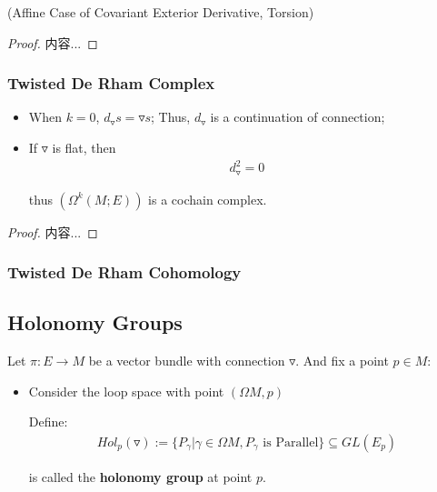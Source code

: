 \documentclass[Total.tex]{subfiles}
\begin{document}
			\begin{proposition}
				(Affine Case of Covariant Exterior Derivative, Torsion)
			\end{proposition}
			\begin{proof}
				内容...
			\end{proof}
			\subsubsection{Twisted De Rham Complex}
			\begin{proposition}
				\begin{itemize}
					\item When $k=0$, $d_\triangledown s=\triangledown s$; Thus, $d_\triangledown$ is a continuation of connection;
					\item If $\triangledown$ is flat, then
					\begin{gather*}
						d_\triangledown^2=0
					\end{gather*}
					
					thus $(\Omega^k(M;E))$ is a cochain complex.
				\end{itemize}
			\end{proposition}
			\begin{proof}
				内容...
			\end{proof}
			
			
			\subsubsection{Twisted De Rham Cohomology}
			\begin{Def}
				
			\end{Def}
			
			\subsection{Holonomy Groups}
				\begin{Def}
					Let $\pi:E\rightarrow M$ be a vector bundle with connection $\triangledown$. And fix a point $p\in M$:
					\begin{itemize}
						\item  Consider the loop space with point $(\Omega M,p)$
						
						Define:
						\begin{gather*}
							Hol_p(\triangledown):=\{P_\gamma|\gamma\in \Omega M,P_\gamma\mbox{ is Parallel}\}\subseteq GL(E_p)
						\end{gather*}
						
						is called the \textbf{holonomy group} at point $p$. 
					\end{itemize}
				\end{Def}
				
\end{document}
